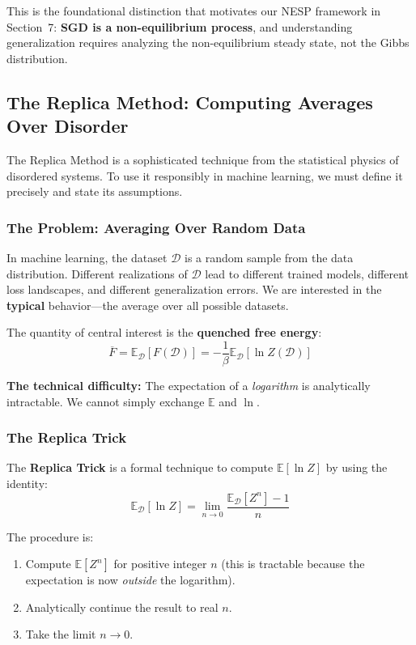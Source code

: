 \documentclass[
  journal=largetwo,
  year=2025,
  volume=37,
]{cup-journal}
\begin{document}
This is the foundational distinction that motivates our NESP framework in Section~7: \textbf{SGD is a non-equilibrium process}, and understanding generalization requires analyzing the non-equilibrium steady state, not the Gibbs distribution.

\subsection{The Replica Method: Computing Averages Over Disorder}

The Replica Method is a sophisticated technique from the statistical physics of disordered systems. To use it responsibly in machine learning, we must define it precisely and state its assumptions.

\subsubsection{The Problem: Averaging Over Random Data}

In machine learning, the dataset $\mathcal{D}$ is a random sample from the data distribution. Different realizations of $\mathcal{D}$ lead to different trained models, different loss landscapes, and different generalization errors. We are interested in the \textbf{typical} behavior---the average over all possible datasets.

The quantity of central interest is the \textbf{quenched free energy}:
\begin{equation}
    \overline{F} = \mathbb{E}_{\mathcal{D}} \left[ F(\mathcal{D}) \right] = -\frac{1}{\beta} \mathbb{E}_{\mathcal{D}} \left[ \ln Z(\mathcal{D}) \right]
\end{equation}

\textbf{The technical difficulty:} The expectation of a \textit{logarithm} is analytically intractable. We cannot simply exchange $\mathbb{E}$ and $\ln$.

\subsubsection{The Replica Trick}

\begin{definition}\label{def:replica_trick}
The \textbf{Replica Trick} is a formal technique to compute $\mathbb{E}[\ln Z]$ by using the identity:
\begin{equation}\label{eq:replica_identity}
    \boxed{\mathbb{E}_{\mathcal{D}}[\ln Z] = \lim_{n \to 0} \frac{\mathbb{E}_{\mathcal{D}}[Z^n] - 1}{n}}
\end{equation}

The procedure is:
\begin{enumerate}
    \item Compute $\mathbb{E}[Z^n]$ for positive integer $n$ (this is tractable because the expectation is now \textit{outside} the logarithm).
    \item Analytically continue the result to real $n$.
    \item Take the limit $n \to 0$.
\end{enumerate}
\end{definition}
\end{document}

